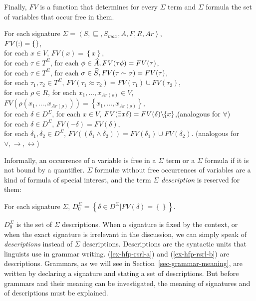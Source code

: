 \documentclass[output=paper,biblatex,babelshorthands,newtxmath,draftmode,colorlinks,citecolor=brown]{langscibook}
\begin{document}
{Finally, $FV$ is a function that determines for every $\Sigma$ term and
$\Sigma$ formula the set of variables that occur free in them.

\begin{mydef}
  For each signature $\Sigma=\left<S,\sqsubseteq,S_{max},A,F,R,Ar\right>$,\\
  $FV(\operatorname{:})=\left\{\right\}$,\\
  for each $x\in V$, $FV(x)=\left\{x\right\}$,\\
  for each $\tau\in T^{\Sigma}$, for each $\phi\in\widehat{A}, FV(\tau\phi)=FV(\tau)$,\\
  for each $\tau\in T^{\Sigma}$, for each $\sigma\in\widehat{S}, FV(\tau\sim\sigma)=FV(\tau)$,\\
  for each $\tau_1, \tau_2\in T^{\Sigma}$, $FV(\tau_1\approx\tau_2)=FV(\tau_1)\cup FV(\tau_2)$,\\
  for each $\rho\in R$, for each $x_1,\ldots, x_{Ar(\rho)}\in V$,\\
  \hspace*{.5cm} $FV(\rho(x_1,\ldots, x_{Ar(\rho)}))=\left\{x_1,\ldots, x_{Ar(\rho)}\right\}$,\\
  for each $\delta\in D^{\Sigma}$, for each $x\in V$,
  $FV(\exists x\delta)=FV(\delta)\backslash\hspace{-.25em}\left\{x \right\}$,\hfill(analogous for $\forall$)\\
  for each $\delta\in D^{\Sigma}$, $FV(\neg\delta)=FV(\delta)$,\\
  for each $\delta_1,\delta_2\in D^{\Sigma}$,
  $FV((\delta_1\land\delta_2))=FV(\delta_1)\cup FV(\delta_2)$.
  \hfill (analogous for $\lor,\rightarrow,\leftrightarrow$)
\end{mydef}

Informally, an occurrence of a variable is free in a $\Sigma$ term or a
$\Sigma$ formula if it is not bound by a quantifier.
$\Sigma$ formulæ without free occurrences of variables are a kind of formula
of special interest, and the term $\Sigma$ \emph{description} is reserved for them:

\begin{mydef}
  For each signature $\Sigma$,
  $D_0^{\Sigma}=\left\{\delta\in D^{\Sigma} | FV(\delta)=\left\{\right\}\right\}$.
\end{mydef}

\noindent
$D_0^{\Sigma}$ is the set of $\Sigma$ descriptions.
When a signature is fixed by the context, or when the exact signature is
irrelevant in the discussion, we can simply speak of \emph{descriptions}
instead of $\Sigma$ descriptions. Descriptions are the syntactic units
that linguists use in grammar writing. (\ref{ex-hfp-rsrl-a}) and (\ref{ex-hfp-rsrl-b}) are descriptions. Grammars, as we will see in
Section~\ref{sec-grammar-meaning}, are written by declaring a signature
and stating a set of descriptions. But before grammars and their meaning can
be investigated, the meaning of signatures and of descriptions must be explained.


}
\end{document}
